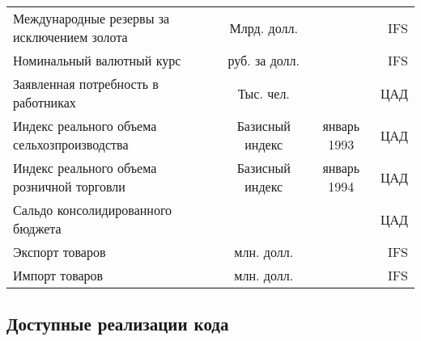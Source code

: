 \documentclass[11pt]{article} %
\begin{document}
\begin{landscape}
\begin{center}
\begin{table}[h!]
\begin{tabular}{lccr}
Международные резервы за исключением золота & Млрд. долл. &  & IFS \\
Номинальный валютный курс & руб. за долл. &  & IFS \\
Заявленная потребность в работниках & Тыс. чел. &  & ЦАД \\
Индекс реального объема сельхозпроизводства & Базисный индекс & январь 1993 & ЦАД\\
Индекс реального объема розничной торговли & Базисный индекс & январь 1994 & ЦАД\\
Сальдо консолидированного бюджета &  &  & ЦАД \\
Экспорт товаров & млн. долл. &  & IFS \\
Импорт товаров & млн. долл. &  & IFS \\
\end{tabular}
\end{table}
\end{center}
\subsection*{Доступные реализации кода}


\end{landscape}
\end{document}
